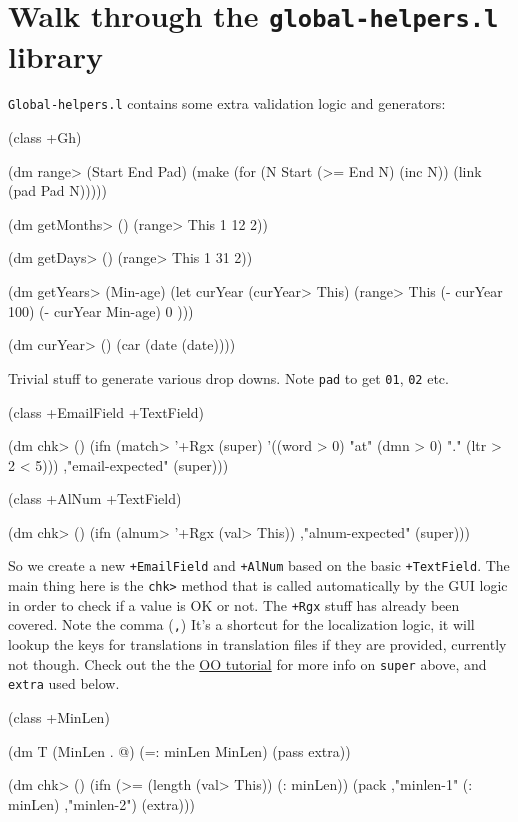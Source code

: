 \section{Walk through the \texttt{global-helpers.l} library}
\label{sec:registration-form}

\texttt{Global-helpers.l} contains some extra validation logic and
generators:

\begin{wideverbatim}
(class +Gh)

(dm range> (Start End Pad) 
    (make 
     (for (N Start (>= End N) (inc N)) (link (pad Pad N)))))
    
(dm getMonths> () 
    (range> This 1 12 2))

(dm getDays> () 
    (range> This 1 31 2))

(dm getYears> (Min-age)
    (let curYear (curYear> This) 
      (range> This (- curYear 100) (- curYear Min-age) 0 )))

(dm curYear> () (car (date (date))))
\end{wideverbatim}

Trivial stuff to generate various drop downs. Note \texttt{pad} to
get \texttt{01}, \texttt{02} etc.


\begin{wideverbatim}
(class +EmailField +TextField)
    
(dm chk> ()
  (ifn 
     (match> '+Rgx (super) '((word > 0) "{at}" (dmn > 0) "." (ltr > 2 < 5))) 
     ,"email-expected" 
     (super)))
    
(class +AlNum +TextField)

(dm chk> ()
  (ifn (alnum> '+Rgx (val> This)) ,"alnum-expected" (super)))
\end{wideverbatim}

So we create a new \texttt{+EmailField} and \texttt{+AlNum} based
on the basic \texttt{+TextField}. The main thing here is the
\texttt{chk>} method that is called automatically by the GUI logic
in order to check if a value is OK or not. The \texttt{+Rgx} stuff has
already been covered. Note the comma (\texttt{,}) It's a shortcut
for the localization logic, it will lookup the keys for translations
in translation files if they are provided, currently not though. Check
out the the
\href{http://www.prodevtips.com/2008/04/11/more-oo-in-pico-lisp/}{OO
  tutorial} for more info on \texttt{super} above, and
\texttt{extra} used below.


\begin{wideverbatim}
(class +MinLen)

(dm T (MinLen . @)
  (=: minLen MinLen)
  (pass extra))

(dm chk> ()
  (ifn 
     (>= (length (val> This)) (: minLen)) 
     (pack ,"minlen-1" (: minLen) ,"minlen-2") 
     (extra)))
\end{wideverbatim}


